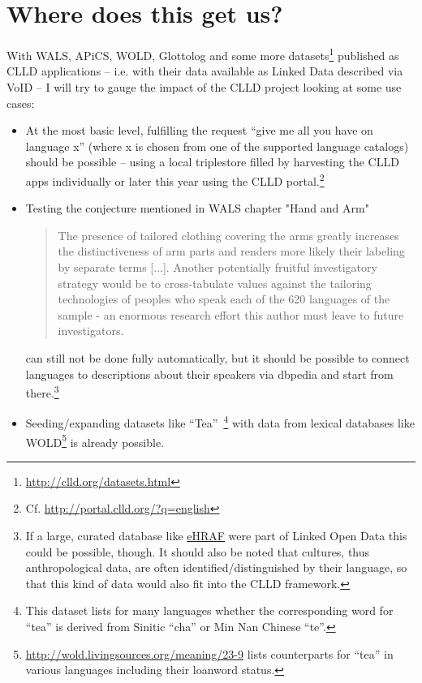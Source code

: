\documentclass[a4paper,10pt]{article}
\begin{document}
\section{Where does this get us?}

With WALS, APiCS, WOLD, Glottolog and some more datasets\footnote{\url{http://clld.org/datasets.html}}
published as CLLD applications -- i.e. with their data available as Linked Data described
via VoID -- I will try to gauge the impact of the CLLD project looking at some use cases:
\begin{itemize}
\item At the most basic level,
fulfilling the request ``give me all you have on language x'' (where x is chosen from one of the supported language catalogs) 
should be possible -- using a local triplestore filled by harvesting the CLLD apps individually
or later this year using the CLLD portal.\footnote{Cf. \url{http://portal.clld.org/?q=english}}
\item Testing the conjecture mentioned in WALS chapter "Hand and Arm" \cite{wals-129}
\begin{quote}
The presence of tailored clothing covering the arms greatly increases the distinctiveness of
arm parts and renders more likely their labeling by separate terms [...]. Another potentially
fruitful investigatory strategy would be to cross-tabulate values against the tailoring
technologies of peoples who speak each of the 620 languages of the sample - an enormous
research effort this author must leave to future investigators.
\end{quote}
can still not be done fully automatically, but it should be possible to connect languages
to descriptions about their speakers via dbpedia and start from there.\footnote{If a large,
curated database like \href{http://www.yale.edu/hraf/}{eHRAF} were part of Linked Open Data
this could be possible, though. It should also be noted that cultures, thus anthropological
data, are often identified/distinguished by their language, so that this kind of data
would also fit into the CLLD framework.}
\item Seeding/expanding datasets like ``Tea''~\cite{wals-138}\footnote{This dataset lists for many
languages whether the corresponding word for ``tea'' is derived from Sinitic ``cha'' or
Min Nan Chinese ``te''.}
with data from lexical databases like WOLD\footnote{\url{http://wold.livingsources.org/meaning/23-9}
 lists counterparts for ``tea'' in various languages including their loanword status.}
is already possible.
\end{itemize}
\end{document}
